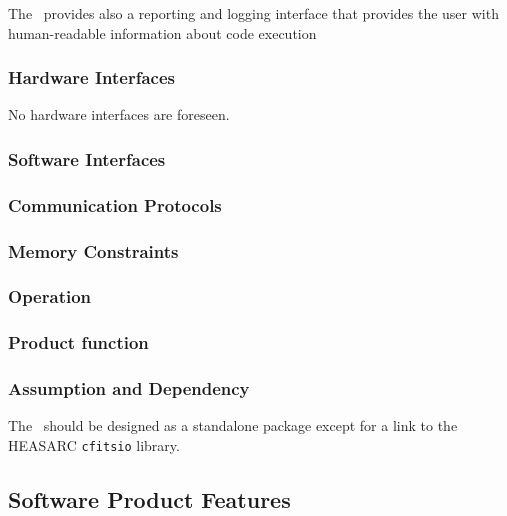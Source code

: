 \documentclass{article}[12pt,a4]
\begin{document}
The \this\ provides also a reporting and logging interface that provides the user with 
human-readable information about code execution


\subsubsection{Hardware Interfaces}

No hardware interfaces are foreseen.


\subsubsection{Software Interfaces}



\subsubsection{Communication Protocols}


\subsubsection{Memory Constraints}


\subsubsection{Operation}


\subsubsection{Product function}


\subsubsection{Assumption and Dependency}

The \this\ should be designed as a standalone package except for a link to the HEASARC
{\tt cfitsio} library.


\subsection{Software Product Features}
\end{document}
